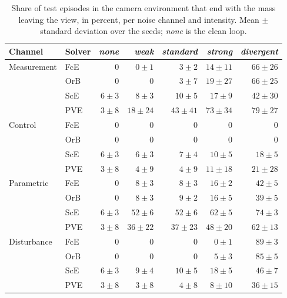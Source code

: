 \begin{table}[htbp]
\centering
\caption{Share of test episodes in the camera environment that end with the mass leaving the view, in percent, per noise channel and intensity. Mean $\pm$ standard deviation over the seeds; \emph{none} is the clean loop.}
\label{tab:perc-noise-terminated}
\begin{tabular}{@{}llrrrrr@{}}
\toprule
Channel & Solver & \emph{none} & \emph{weak} & \emph{standard} & \emph{strong} & \emph{divergent} \\
\midrule
Measurement & FcE & $0$ & $0 \pm 1$ & $3 \pm 2$ & $14 \pm 11$ & $66 \pm 26$ \\
 & OrB & $0$ & $0$ & $3 \pm 7$ & $19 \pm 27$ & $66 \pm 25$ \\
 & ScE & $6 \pm 3$ & $8 \pm 3$ & $10 \pm 5$ & $17 \pm 9$ & $42 \pm 30$ \\
 & PVE & $3 \pm 8$ & $18 \pm 24$ & $43 \pm 41$ & $73 \pm 34$ & $79 \pm 27$ \\
\midrule
Control & FcE & $0$ & $0$ & $0$ & $0$ & $0$ \\
 & OrB & $0$ & $0$ & $0$ & $0$ & $0$ \\
 & ScE & $6 \pm 3$ & $6 \pm 3$ & $7 \pm 4$ & $10 \pm 5$ & $18 \pm 5$ \\
 & PVE & $3 \pm 8$ & $4 \pm 9$ & $4 \pm 9$ & $11 \pm 18$ & $21 \pm 28$ \\
\midrule
Parametric & FcE & $0$ & $8 \pm 3$ & $8 \pm 3$ & $16 \pm 2$ & $42 \pm 5$ \\
 & OrB & $0$ & $8 \pm 3$ & $9 \pm 2$ & $16 \pm 5$ & $39 \pm 5$ \\
 & ScE & $6 \pm 3$ & $52 \pm 6$ & $52 \pm 6$ & $62 \pm 5$ & $74 \pm 3$ \\
 & PVE & $3 \pm 8$ & $36 \pm 22$ & $37 \pm 23$ & $48 \pm 20$ & $62 \pm 13$ \\
\midrule
Disturbance & FcE & $0$ & $0$ & $0$ & $0 \pm 1$ & $89 \pm 3$ \\
 & OrB & $0$ & $0$ & $0$ & $5 \pm 3$ & $85 \pm 5$ \\
 & ScE & $6 \pm 3$ & $9 \pm 4$ & $10 \pm 5$ & $18 \pm 5$ & $46 \pm 7$ \\
 & PVE & $3 \pm 8$ & $3 \pm 8$ & $4 \pm 8$ & $8 \pm 10$ & $36 \pm 15$ \\
\bottomrule
\end{tabular}
\end{table}
